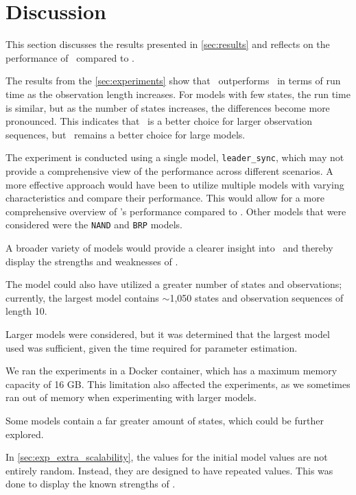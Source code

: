 \section{Discussion}\label{sec:discussion}
This section discusses the results presented in \autoref{sec:results} and reflects on the performance of \Cupaal\ compared to \Jajapy.

The results from the \autoref{sec:experiments} show that \Cupaal\ outperforms \Jajapy\ in terms of run time as the observation length increases.
For models with few states, the run time is similar, but as the number of states increases, the differences become more pronounced.
This indicates that \Cupaal\ is a better choice for larger observation sequences, but \Jajapy\ remains a better choice for large models.

The experiment is conducted using a single model, \texttt{leader\_sync}, which may not provide a comprehensive view of the performance across different scenarios.
A more effective approach would have been to utilize multiple models with varying characteristics and compare their performance.
This would allow for a more comprehensive overview of \Cupaal 's performance compared to \Jajapy.
Other models that were considered were the \texttt{NAND} and \texttt{BRP} models.

A broader variety of models would provide a clearer insight into \Cupaal\ and thereby display the strengths and weaknesses of \Cupaal.


The model could also have utilized a greater number of states and observations; currently, the largest model contains $\sim$1,050 states and observation sequences of length 10.

Larger models were considered, but it was determined that the largest model used was sufficient, given the time required for parameter estimation.

We ran the experiments in a Docker container, which has a maximum memory capacity of 16 GB. This limitation also affected the experiments, as we sometimes ran out of memory when experimenting with larger models.

Some models contain a far greater amount of states, which could be further explored.

In \autoref{sec:exp_extra_scalability}, the values for the initial model values are not entirely random. Instead, they are designed to have repeated values.
This was done to display the known strengths of \Cupaal.

